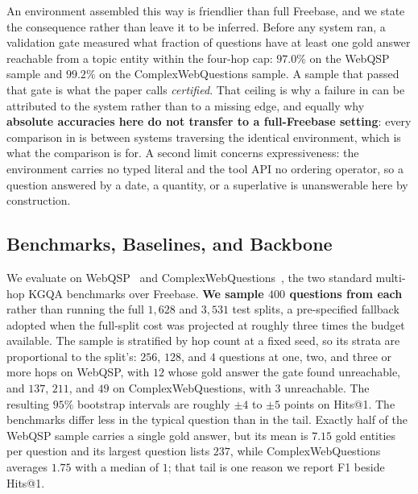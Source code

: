An environment assembled this way is friendlier than full Freebase, and
we state the consequence rather than leave it to be inferred. Before any
system ran, a validation gate measured what fraction of questions have
at least one gold answer reachable from a topic entity within the
four-hop cap: $97.0\%$ on the WebQSP sample and $99.2\%$ on the
ComplexWebQuestions sample. A sample that passed that gate is what the
paper calls \emph{certified}. That ceiling is why a failure in
 can be attributed to the system rather than to
a missing edge, and equally why \textbf{absolute accuracies here do not
transfer to a full-Freebase setting}: every comparison in
 is between systems traversing the identical
environment, which is what the comparison is for. A second limit
concerns expressiveness: the environment carries no typed literal and
the tool API no ordering operator, so a question answered by a date, a
quantity, or a superlative is unanswerable here by construction.

\subsection{Benchmarks, Baselines, and Backbone}\label{sec:baselines}

We evaluate on WebQSP~\cite{yih2016value} and
ComplexWebQuestions~\cite{talmor2018web}, the two standard multi-hop
KGQA benchmarks over Freebase. \textbf{We sample $400$ questions from
each} rather than running the full $1{,}628$ and $3{,}531$ test splits,
a pre-specified fallback adopted when the full-split cost was projected
at roughly three times the budget available. The sample is stratified by
hop count at a fixed seed, so its strata are proportional to the
split's: $256$, $128$, and $4$ questions at one, two, and three or more
hops on WebQSP, with $12$ whose gold answer the gate found unreachable,
and $137$, $211$, and $49$ on ComplexWebQuestions, with $3$ unreachable.
The resulting $95\%$ bootstrap intervals are roughly $\pm4$ to $\pm5$
points on Hits@1. The benchmarks differ less in the typical question
than in the tail. Exactly half of the WebQSP sample carries a single
gold answer, but its mean is $7.15$ gold entities per question and its
largest question lists $237$, while ComplexWebQuestions averages $1.75$
with a median of $1$; that tail is one reason we report F1 beside
Hits@1.

